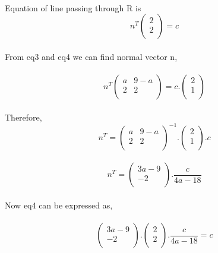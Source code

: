 \documentclass[journal,12pt,twocolumn]{IEEEtran}
\begin{document}
\\
Equation of line passing through R is\\
\begin{equation}
n^T
     \begin{pmatrix}
  2\\
  2\\
 \end{pmatrix}%
  = c \label{eq-4}
\end{equation}
 \\
 From eq3 and eq4 we can find normal vector n,\\
 \\
 \begin{equation}
n^T
     \begin{pmatrix}
  a & 9-a\\
  2 & 2\\
 \end{pmatrix}%
  = c.\begin{pmatrix}
  2\\
  1\\
 \end{pmatrix}%
 \label{eq-5}
\end{equation}
 \\
 Therefore,\\
 \begin{equation}
n^T = 
     \begin{pmatrix}
  a & 9-a\\
  2 & 2\\
 \end{pmatrix}%
  ^{-1}
  .
  \begin{pmatrix}
  2\\
  1\\
 \end{pmatrix}%
 .c \label{eq-6}
\end{equation}
 \\
\begin{equation}
n^T = 
     \begin{pmatrix}
  3a-9\\
  -2\\
 \end{pmatrix}%
  .\frac{c}{4a-18}
 \label{eq-7}
\end{equation}
 \\
 Now eq4 can be expressed as,\\
 \\
  \begin{equation}
  \begin{pmatrix}
  3a - 9\\
  -2\\
 \end{pmatrix}%
 .
     \begin{pmatrix}
  2\\
  2\\
 \end{pmatrix}%
  .\frac{c}{4a-18} = c
 \label{eq-8}
\end{equation}
\end{document}
